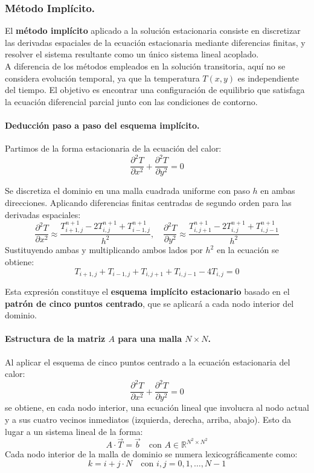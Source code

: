 \documentclass{article}
\begin{document}
\newpage
\subsubsection{Método Implícito.}
\label{subsubsec:mie}
El \textbf{método implícito} aplicado a la solución estacionaria consiste en discretizar las derivadas espaciales de la ecuación estacionaria mediante diferencias finitas, y resolver el sistema resultante como un único sistema lineal acoplado.\\

A diferencia de los métodos empleados en la solución transitoria, aquí no se considera evolución temporal, ya que la temperatura $T(x, y)$ es independiente del tiempo. El objetivo es encontrar una configuración de equilibrio que satisfaga la ecuación diferencial parcial junto con las condiciones de contorno.

\paragraph{Deducción paso a paso del esquema implícito.} Partimos de la forma estacionaria de la ecuación del calor:
\begin{equation}  
    \frac{\partial^2 T}{\partial x^2} + \frac{\partial^2 T}{\partial y^2} = 0
\end{equation}

Se discretiza el dominio en una malla cuadrada uniforme con paso $h$ en ambas direcciones. Aplicando diferencias finitas centradas de segundo orden para las derivadas espaciales:
$$
\frac{\partial^2 T}{\partial x^2} \approx \frac{T_{i+1,j}^{n+1} - 2T_{i,j}^{n+1} + T_{i-1,j}^{n+1}}{h^2}, \quad
\frac{\partial^2 T}{\partial y^2} \approx \frac{T_{i,j+1}^{n+1} - 2T_{i,j}^{n+1} + T_{i,j-1}^{n+1}}{h^2}
$$
Sustituyendo ambas y multiplicando ambos lados por $h^2$
en la ecuación se obtiene:
\begin{equation}
    T_{i+1,j} + T_{i-1,j} + T_{i,j+1} + T_{i,j-1} - 4T_{i,j} = 0
\end{equation}

Esta expresión constituye el \textbf{esquema implícito estacionario} basado en el \textbf{patrón de cinco puntos centrado}, que se aplicará a cada nodo interior del dominio.

\paragraph{Estructura de la matriz $A$ para una malla $N \times N$.} Al aplicar el esquema de cinco puntos centrado a la ecuación estacionaria del calor:
$$
\frac{\partial^2 T}{\partial x^2} + \frac{\partial^2 T}{\partial y^2} = 0
$$
se obtiene, en cada nodo interior, una ecuación lineal que involucra al nodo actual y a sus cuatro vecinos inmediatos (izquierda, derecha, arriba, abajo). Esto da lugar a un sistema lineal de la forma:
\begin{equation}
    A \cdot \vec{T} = \vec{b} \quad \text{con } A \in \mathbb{R}^{N^2 \times N^2} 
\end{equation}
Cada nodo interior de la malla de dominio se numera lexicográficamente como:
$$
k = i + j \cdot N \quad \text{con } i, j = 0, 1, \dots, N-1
$$
\end{document}
